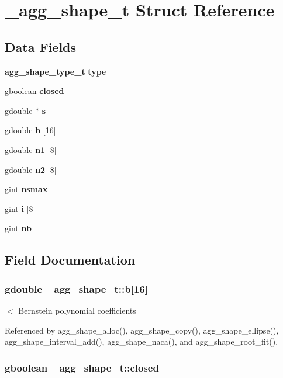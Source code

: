 \section{\+\_\+agg\+\_\+shape\+\_\+t Struct Reference}
\label{struct__agg__shape__t}
\subsection*{Data Fields}
\begin{DoxyCompactItemize}
\item 
{\bf agg\+\_\+shape\+\_\+type\+\_\+t} {\bf type}
\item 
gboolean {\bf closed}
\item 
gdouble $\ast$ {\bf s}
\item 
gdouble {\bf b} [16]
\item 
gdouble {\bf n1} [8]
\item 
gdouble {\bf n2} [8]
\item 
gint {\bf nsmax}
\item 
gint {\bf i} [8]
\item 
gint {\bf nb}
\end{DoxyCompactItemize}


\subsection{Field Documentation}
\subsubsection[{b}]{\setlength{\rightskip}{0pt plus 5cm}gdouble \+\_\+agg\+\_\+shape\+\_\+t\+::b[16]}\label{struct__agg__shape__t_a75cfafd5f038accf500ca50d0cda00d1}
$<$ Bernstein polynomial coefficients 

Referenced by agg\+\_\+shape\+\_\+alloc(), agg\+\_\+shape\+\_\+copy(), agg\+\_\+shape\+\_\+ellipse(), agg\+\_\+shape\+\_\+interval\+\_\+add(), agg\+\_\+shape\+\_\+naca(), and agg\+\_\+shape\+\_\+root\+\_\+fit().

\subsubsection[{closed}]{\setlength{\rightskip}{0pt plus 5cm}gboolean \+\_\+agg\+\_\+shape\+\_\+t\+::closed}\label{struct__agg__shape__t_ad821e2d312f75c318bbc4f9b72ff50f7}


